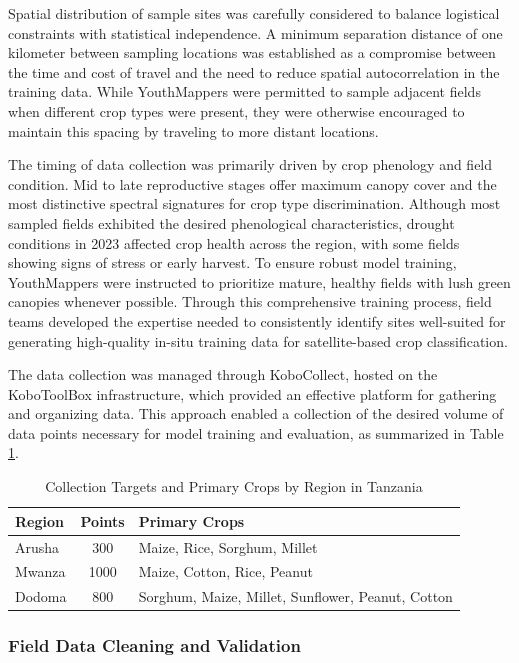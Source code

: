 \documentclass[
  journal,
  twocolumn]{IEEEtran}
\begin{document}
Spatial distribution of sample sites was carefully considered to balance
logistical constraints with statistical independence. A minimum
separation distance of one kilometer between sampling locations was
established as a compromise between the time and cost of travel and the
need to reduce spatial autocorrelation in the training data. While
YouthMappers were permitted to sample adjacent fields when different
crop types were present, they were otherwise encouraged to maintain this
spacing by traveling to more distant locations.

The timing of data collection was primarily driven by crop phenology and
field condition. Mid to late reproductive stages offer maximum canopy
cover and the most distinctive spectral signatures for crop type
discrimination. Although most sampled fields exhibited the desired
phenological characteristics, drought conditions in 2023 affected crop
health across the region, with some fields showing signs of stress or
early harvest. To ensure robust model training, YouthMappers were
instructed to prioritize mature, healthy fields with lush green canopies
whenever possible. Through this comprehensive training process, field
teams developed the expertise needed to consistently identify sites
well-suited for generating high-quality in-situ training data for
satellite-based crop classification.

The data collection was managed through KoboCollect, hosted on the
KoboToolBox infrastructure, which provided an effective platform for
gathering and organizing data. This approach enabled a collection of the
desired volume of data points necessary for model training and
evaluation, as summarized in Table \ref{tab:data_n}.

\begin{table}[h!]
\centering
\small
\begin{tabular}{@{}lcp{4.5cm}@{}}
\toprule
\textbf{Region} & \textbf{Points} & \textbf{Primary Crops} \\
\midrule
Arusha & 300 & Maize, Rice, Sorghum, Millet \\
\midrule
Mwanza & 1000 & Maize, Cotton, Rice, Peanut \\
\midrule
Dodoma & 800 & Sorghum, Maize, Millet, Sunflower, Peanut, Cotton \\
\bottomrule
\end{tabular}
\caption{Collection Targets and Primary Crops by Region in Tanzania}
\label{tab:data_n}
\end{table}

\subsubsection{Field Data Cleaning and
Validation}\label{field-data-cleaning-and-validation}
\end{document}
